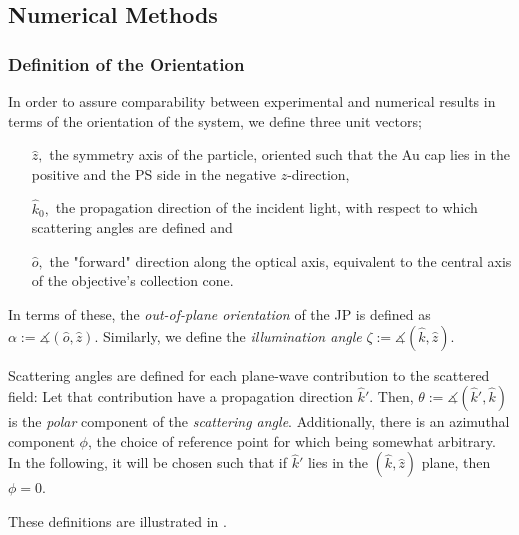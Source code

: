 \documentclass[10pt]{article}
\newcommand{\reffig}[2]{\mbox{\sffamily{Figure \ref{#1}#2}}}
\begin{document}





\subsection*{Numerical Methods}

\subsubsection*{Definition of the Orientation}
 

In order to assure comparability between experimental and numerical results in terms of the orientation of the system, we define three unit vectors;  
\begin{itemize}
    \item[$\hat{z},$] the symmetry axis of the particle, oriented such that the Au cap lies in the positive and the PS side in the negative $z$-direction, 
    \item[$\hat{k}_0,$] the propagation direction of the incident light, with respect to which scattering angles are defined and
    \item[$\hat{o},$] the "forward" direction along the optical axis, equivalent to the central axis of the objective's collection cone. 
\end{itemize}
In terms of these, the \emph{out-of-plane orientation} of the JP is defined as
$\alpha := \measuredangle( \hat{o}, \hat{z} )$.
Similarly, we define the \emph{illumination angle} 
$\zeta := \measuredangle( \hat{k}, \hat{z} )$. 

Scattering angles are defined for each plane-wave contribution to the scattered field: 
Let that contribution have a propagation direction $\hat{k}'$. 
Then, \mbox{$\theta := \measuredangle( \hat{k}', \hat{k} )$} is the \emph{polar} component of the \emph{scattering angle}. 
Additionally, there is an azimuthal component $\phi$, the choice of reference point for which being somewhat arbitrary. 
In the following, it will be chosen such that if $\hat{k}'$ lies in the $(\hat{k},\hat{z})$ plane, then $\phi=0$.

These definitions are illustrated in \reffig{fig:vectors-and-angles}{}. 
\end{document}
